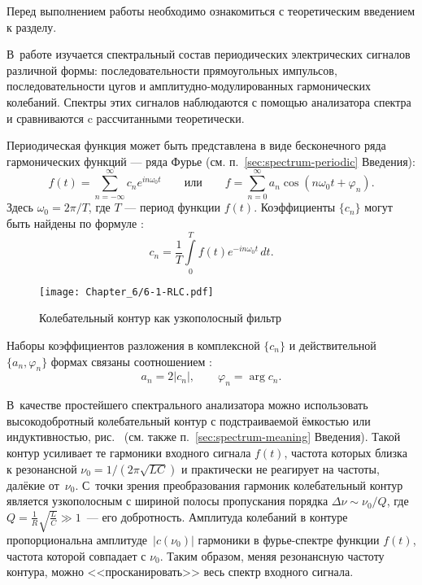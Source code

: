 

Перед выполнением работы необходимо ознакомиться с теоретическим введением
к разделу.

В~работе изучается спектральный состав периодических электрических сигналов
различной формы: последовательности прямоугольных импульсов, последовательности
цугов и амплитудно-модулированных гармонических колебаний. Спектры этих сигналов
наблюдаются с помощью анализатора спектра и сравниваются c рассчитанными
теоретически.

Периодическая функция может быть представлена в виде бесконечного ряда
гармонических функций --- ряда Фурье (см. п.~\ref{sec:spectrum-periodic}
Введения):
\begin{equation*}
f(t) = \sum_{n=-\infty}^{\infty} c_n e^{in\omega_0 t}\qquad\text{или}\qquad
f=\sum_{n=0}^{\infty} a_n \cos (n\omega_0 t + \varphi_n).
\end{equation*}
Здесь $\omega_0 = 2\pi/T$, где $T$ --- период функции $f(t)$.
Коэффициенты $\{c_n\}$ могут быть найдены по формуле
:
\begin{equation*}
    c_n=\frac{1}{T}\int\limits_{0}^{T} f(t)e^{-in\omega_0 t}\,dt.
\end{equation*}
\begin{wrapfigure}{o}{0.3\textwidth}
    \centering
    \texttt{[image: Chapter\_6/6-1-RLC.pdf]}
    \caption{Колебательный контур как узкополосный фильтр}
\end{wrapfigure}
Наборы коэффициентов разложения в комплексной $\{c_n\}$ и действительной
$\{a_n,\varphi_n\}$ формах связаны соотношением :
\begin{equation*}
a_n = 2|c_n|,\qquad \varphi_n = \arg c_n.
\end{equation*}

В~качестве простейшего спектрального анализатора можно использовать
высокодобротный колебательный контур с подстраиваемой ёмкостью или
индуктивностью, рис.~
(см. также п.~\ref{sec:spectrum-meaning} Введения).
Такой контур усиливает те гармоники входного сигнала $f(t)$,
частота которых близка к резонансной
$\nu_{0} = 1/(2\pi\sqrt{LC})$ и практически не реагирует на частоты,
далёкие от~$\nu_{0}$. С~точки зрения преобразования гармоник колебательный контур
является узкополосным  с шириной полосы
пропускания порядка $\Delta \nu \sim \nu_{0}/ Q$, где $Q =
\frac{1}{R}\sqrt{\frac{L}{C}} \gg 1$~--- его добротность. Амплитуда колебаний
в контуре пропорциональна амплитуде~$|c(\nu_0)|$ гармоники в фурье-спектре функции $f(t)$,
частота которой совпадает с $\nu_{0}$. 
Таким образом, меняя резонансную частоту контура,
можно <<просканировать>> весь спектр входного сигнала.

